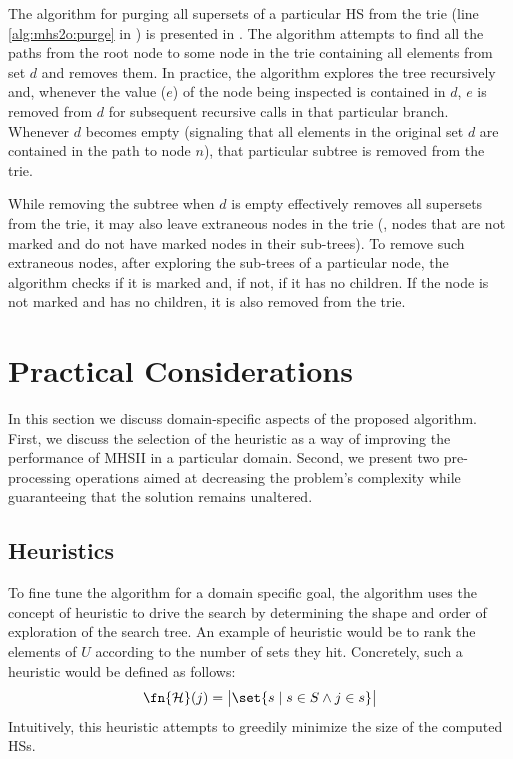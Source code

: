 The algorithm for purging all supersets of a particular \ac{HS} from
the trie (line \ref{alg:mhs2o:purge} in
) is presented in
.
%
The algorithm attempts to find all the paths from the root node to
some node in the trie containing all elements from set $d$ and removes
them.
%
In practice, the algorithm explores the tree recursively and, whenever
the value ($e$) of the node being inspected is contained in $d$, $e$
is removed from $d$ for subsequent recursive calls in that particular
branch.
%
Whenever $d$ becomes empty (signaling that all elements in the
original set $d$ are contained in the path to node $n$), that
particular subtree is removed from the trie.

While removing the subtree when $d$ is empty effectively removes all
supersets from the trie, it may also leave extraneous nodes in the
trie (\ie, nodes that are not marked and do not have marked nodes in
their sub-trees).
%
To remove such extraneous nodes, after exploring the sub-trees of a
particular node, the algorithm checks if it is marked and, if not, if
it has no children.
%
If the node is not marked and has no children, it is also removed from
the trie.

\section{Practical Considerations}
In this section we discuss domain-specific aspects of the proposed
algorithm.
%
First, we discuss the selection of the heuristic as a way of improving
the performance of \ac{MHSII} in a particular domain.
%
Second, we present two pre-processing operations aimed at decreasing
the problem's complexity while guaranteeing that the solution remains
unaltered.

\subsection{Heuristics}
\label{sec:mhs2o:heuristics}
To fine tune the algorithm for a domain specific goal, the algorithm
uses the concept of heuristic to drive the search by determining the
shape and order of exploration of the search tree.
%
An example of heuristic would be to rank the elements of $U$ according
to the number of sets they hit.
%
Concretely, such a heuristic would be defined as follows:
\begin{equation}
  \fn{\mathcal H}(j) = \big|\set{s \mid s \in S \wedge j \in s}\big|
\end{equation}
%
Intuitively, this heuristic attempts to greedily minimize the size of
the computed \acp{HS}.

